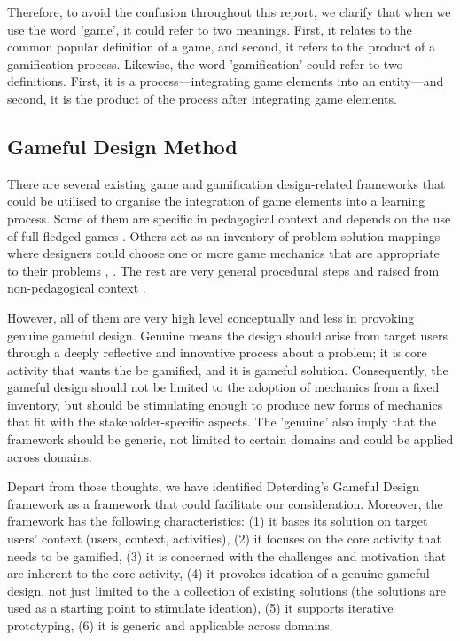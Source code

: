 \documentclass[12pt, a4paper]{report}
\begin{document}
Therefore, to avoid the confusion throughout this report, we clarify that when we use the word 'game', it could refer to two meanings. First, it relates to the common popular definition of a game, and second, it refers to the product of a gamification process. Likewise, the word 'gamification' could refer to two definitions. First, it is a process---integrating game elements into an entity---and second, it is the product of the process after integrating game elements.  

\subsection{Gameful Design Method}
There are several existing game and gamification design-related frameworks that could be utilised to organise the integration of game elements into a learning process. Some of them are specific in pedagogical context and depends on the use of full-fledged games \cite{garris2002games, yusoff2009conceptual, de2011serious}. Others act as an inventory of problem-solution mappings where designers could choose one or more game mechanics that are appropriate to their problems \cite{arnab2015mapping}, \cite{chou2013octalysis}. The rest are very general procedural steps and raised from non-pedagogical context \cite{werbach2012win, kumar2013framework}. 

However, all of them are very high level conceptually and less in provoking genuine gameful design. Genuine means the design should arise from target users through a deeply reflective and innovative process about a problem; it is core activity that wants the be gamified, and it is gameful solution. Consequently, the gameful design should not be limited to the adoption of mechanics from a fixed inventory, but should be stimulating enough to produce new forms of mechanics that fit with the stakeholder-specific aspects. The 'genuine' also imply that the framework should be generic, not limited to certain domains and could be applied across domains.

Depart from those thoughts, we have identified Deterding's Gameful Design framework \cite{deterding2015lens} as a framework that could facilitate our consideration.  Moreover, the framework has the following characteristics: (1) it bases its solution on target users' context (users, context, activities), (2) it focuses on the core activity that needs to be gamified, (3) it is concerned with the challenges and motivation that are inherent to the core activity, (4) it provokes ideation of a genuine gameful design, not just limited to the a collection of existing solutions (the solutions are used as a starting point to stimulate ideation), (5) it supports iterative prototyping, (6) it is generic and applicable across domains.               
\end{document}

